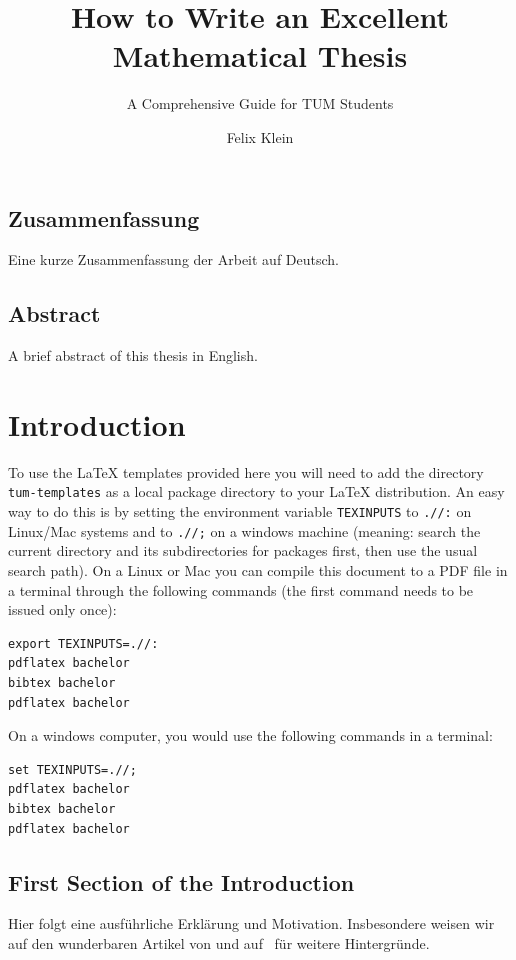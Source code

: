 \documentclass[%
thesis=student,%
coverpage=false,%
titlepage=false,%
headmarks=true, %
german,%
font=libertine, %
math=newpxtx, %
BCOR=5mm,%
coverBCOR=11mm%
]{tumbook}
\title{How to Write an Excellent Mathematical Thesis}
\subtitle{A Comprehensive Guide for TUM Students}
\author{Felix Klein}
\begin{document}
\frontmatter
\maketitle

\section*{Zusammenfassung}
Eine kurze Zusammenfassung der Arbeit auf Deutsch.

\section*{Abstract}
A brief abstract of this thesis in English.

\cleardoublepage{}

\tableofcontents

\mainmatter{}
\chapter{Introduction}

To use the \LaTeX{} templates provided here you will need to add the directory \verb|tum-templates| as a local package directory to your \LaTeX{} distribution. An easy way to do this is by setting the environment variable \verb|TEXINPUTS| to \verb|.//:| on Linux/Mac systems and to \verb|.//;| on a windows machine (meaning: search the current directory and its subdirectories for packages first, then use the usual search path). On a Linux or Mac you can compile this document to a PDF file in a terminal through the following commands (the first command needs to be issued only once):
\begin{verbatim}
export TEXINPUTS=.//:
pdflatex bachelor
bibtex bachelor
pdflatex bachelor
\end{verbatim}

On a windows computer, you would use the following commands in a terminal:

\begin{verbatim}
set TEXINPUTS=.//;
pdflatex bachelor
bibtex bachelor
pdflatex bachelor
\end{verbatim}

\section{First Section of the Introduction}%
\label{sec:first-sect-intr}
Hier folgt eine ausführliche Erklärung und Motivation. Insbesondere weisen wir auf den wunderbaren Artikel von \textcite{Edmonds:1965} und auf~\cite{GareyJohnson:1979} für weitere Hintergründe.
\end{document}
